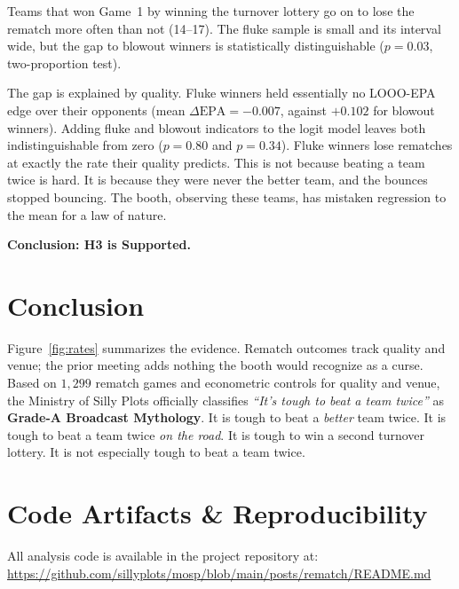 \documentclass[10pt,twocolumn,letterpaper]{article}
\begin{document}
Teams that won Game~1 by winning the turnover lottery go on to lose the rematch more often than not (14--17). The fluke sample is small and its interval wide, but the gap to blowout winners is statistically distinguishable ($p = 0.03$, two-proportion test).

The gap is explained by quality. Fluke winners held essentially no LOOO-EPA edge over their opponents (mean $\Delta\text{EPA} = -0.007$, against $+0.102$ for blowout winners). Adding fluke and blowout indicators to the logit model leaves both indistinguishable from zero ($p = 0.80$ and $p = 0.34$). Fluke winners lose rematches at exactly the rate their quality predicts. This is not because beating a team twice is hard. It is because they were never the better team, and the bounces stopped bouncing. The booth, observing these teams, has mistaken regression to the mean for a law of nature.

\noindent\textbf{Conclusion: H3 is Supported.}

\section{Conclusion}
Figure~\ref{fig:rates} summarizes the evidence. Rematch outcomes track quality and venue; the prior meeting adds nothing the booth would recognize as a curse. Based on $1{,}299$ rematch games and econometric controls for quality and venue, the Ministry of Silly Plots officially classifies \textit{``It's tough to beat a team twice''} as \textbf{Grade-A Broadcast Mythology}. It is tough to beat a \textit{better} team twice. It is tough to beat a team twice \textit{on the road}. It is tough to win a second turnover lottery. It is not especially tough to beat a team twice.

\section{Code Artifacts \& Reproducibility}
All analysis code is available in the project repository at:\\
\url{https://github.com/sillyplots/mosp/blob/main/posts/rematch/README.md}
\end{document}
